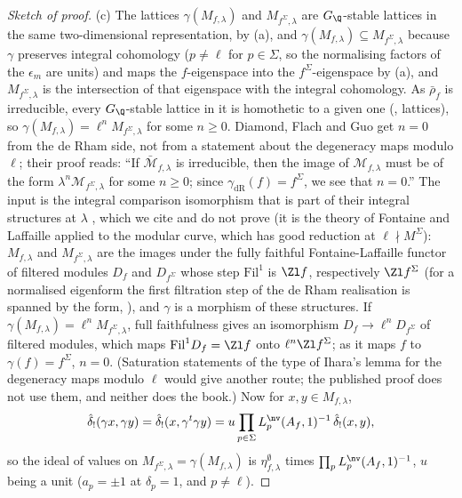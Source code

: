 \begin{proof}[Sketch of proof]
(c) The lattices $\gamma(M_{f,\lambda})$ and $M_{f^\Sigma,\lambda}$ are $G_\Q$-stable lattices in the same two-dimensional representation, by (a), and $\gamma(M_{f,\lambda})\subseteq M_{f^\Sigma,\lambda}$ because
$\gamma$ preserves integral cohomology ($p\ne\ell$ for $p\in\Sigma$, so the normalising factors of the $\epsilon_m$ are units) and maps the $f$-eigenspace into the $f^\Sigma$-eigenspace by (a), and
$M_{f^\Sigma,\lambda}$ is the intersection of that eigenspace with the integral cohomology. As $\bar\rho_f$ is irreducible, every
$G_\Q$-stable lattice in it is homothetic to a given one (, lattices), so $\gamma(M_{f,\lambda})=\ell^nM_{f^\Sigma,\lambda}$ for some $n\ge0$. Diamond, Flach and Guo
get $n=0$ from the de Rham side, not from a statement about the degeneracy maps modulo $\ell$; their proof reads: ``If $\bar{\mathcal M}_{f,\lambda}$ is irreducible, then the image of
$\mathcal M_{f,\lambda}$ must be of the form $\lambda^n\mathcal M_{f^\Sigma,\lambda}$ for some $n\geqslant0$; since $\gamma_{\mathrm{dR}}(f)=f^\Sigma$, we see that $n=0$.'' The input is the integral comparison
isomorphism that is part of their integral structures at $\lambda$ \cite[Sections 1.1.2, 1.2.5]{DFG04}, which we cite and do not prove (it is the theory of Fontaine and Laffaille \cite{FontaineLaffaille}
applied to the modular curve, which has good reduction at $\ell\nmid M^\Sigma$): $M_{f,\lambda}$ and $M_{f^\Sigma,\lambda}$ are the images under the fully faithful Fontaine-Laffaille functor of
filtered modules $D_f$ and $D_{f^\Sigma}$ whose step $\mathrm{Fil}^1$ is $\Zl f$, respectively $\Zl f^\Sigma$ (for a normalised eigenform the first filtration step of the de Rham realisation is spanned by
the form, \cite[(15)]{DFG04}), and $\gamma$ is a morphism of these structures. If $\gamma(M_{f,\lambda})=\ell^nM_{f^\Sigma,\lambda}$, full faithfulness gives an isomorphism $D_f\to\ell^nD_{f^\Sigma}$ of filtered
modules, which maps $\mathrm{Fil}^1D_f=\Zl f$ onto $\ell^n\Zl f^\Sigma$; as it maps $f$ to $\gamma(f)=f^\Sigma$, $n=0$. (Saturation statements of the type of Ihara's lemma for the degeneracy maps
modulo $\ell$ would give another route; the published proof does not use them, and neither does the book.) Now for $x,y\in M_{f,\lambda}$,
\[
\hat\delta_!(\gamma x,\gamma y)=\hat\delta_!(x,\gamma^t\gamma y)=u\prod_{p\in\Sigma}L^{\nv}_p(A_f,1)^{-1}\,\hat\delta_!(x,y),
\]
so the ideal of values on $M_{f^\Sigma,\lambda}=\gamma(M_{f,\lambda})$ is $\eta^\emptyset_{f,\lambda}$ times $\prod_pL^{\nv}_p(A_f,1)^{-1}$, $u$ being a unit ($a_p=\pm1$ at $\delta_p=1$, and $p\ne\ell$).
\end{proof}

